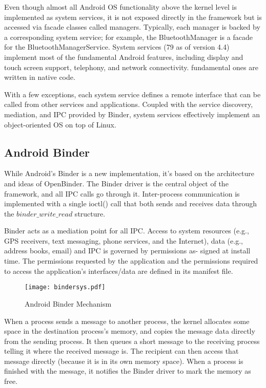 Even though almost all Android OS functionality above the kernel level is implemented as system services, it is not exposed directly in the framework but is accessed via facade classes called managers. Typically, each manager is backed by a corresponding system service; for example, the BluetoothManager is a facade for the BluetoothManagerService.  System services (79 as of version 4.4) implement most of the fundamental Android features, including display and touch screen support, telephony, and network connectivity. fundamental ones are written in native code.

With a few exceptions, each system service defines a remote interface that can be called from other services and applications. Coupled with the service discovery, mediation, and IPC provided by Binder, system services effectively implement an object-oriented OS on top of Linux.

\subsection*{Android Binder}

While Android’s Binder is a new implementation, it’s based on the architecture and ideas of OpenBinder.
The Binder driver is the central object of the framework, and all IPC calls
go through it. Inter-process communication is implemented with a single ioctl() call that both sends and receives data through the $binder\_write\_read$ structure.

Binder acts as a mediation point for all IPC. Access to system resources (e.g., GPS receivers, text messaging, phone services, and the Internet), data (e.g., address books, email) and IPC is governed by permissions as- signed at install time. The permissions requested by the application and the permissions required to access the application’s interfaces/data are defined in its manifest file.

\begin{figure}[H]
\centering
\texttt{[image: bindersys.pdf]}
\caption{Android Binder Mechanism}
\label{fig:androidmodel}
\end{figure}



When a process sends a message to another process, the kernel allocates some space in the destination process’s memory, and copies the message data directly from the sending process. It then queues a short message to the receiving process telling it where the received message is. The recipient can then access that message directly (because it is in its own memory space). When a process is  finished with the message, it notifies the Binder driver to mark the memory as free.

